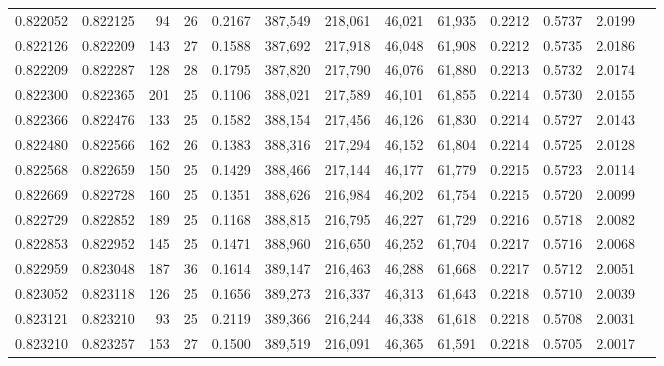 \begin{tabular}{rrrrrrrrrrrrr}
0.822052 & 0.822125 &    94 &  26 &                                     0.2167 & 387,549 & 218,061 &  46,021 &  61,935 & 0.2212 & 0.5737 & 2.0199 \\
0.822126 & 0.822209 &   143 &  27 &                                     0.1588 & 387,692 & 217,918 &  46,048 &  61,908 & 0.2212 & 0.5735 & 2.0186 \\
0.822209 & 0.822287 &   128 &  28 &                                     0.1795 & 387,820 & 217,790 &  46,076 &  61,880 & 0.2213 & 0.5732 & 2.0174 \\
0.822300 & 0.822365 &   201 &  25 &                                     0.1106 & 388,021 & 217,589 &  46,101 &  61,855 & 0.2214 & 0.5730 & 2.0155 \\
0.822366 & 0.822476 &   133 &  25 &                                     0.1582 & 388,154 & 217,456 &  46,126 &  61,830 & 0.2214 & 0.5727 & 2.0143 \\
0.822480 & 0.822566 &   162 &  26 &                                     0.1383 & 388,316 & 217,294 &  46,152 &  61,804 & 0.2214 & 0.5725 & 2.0128 \\
0.822568 & 0.822659 &   150 &  25 &                                     0.1429 & 388,466 & 217,144 &  46,177 &  61,779 & 0.2215 & 0.5723 & 2.0114 \\
0.822669 & 0.822728 &   160 &  25 &                                     0.1351 & 388,626 & 216,984 &  46,202 &  61,754 & 0.2215 & 0.5720 & 2.0099 \\
0.822729 & 0.822852 &   189 &  25 &                                     0.1168 & 388,815 & 216,795 &  46,227 &  61,729 & 0.2216 & 0.5718 & 2.0082 \\
0.822853 & 0.822952 &   145 &  25 &                                     0.1471 & 388,960 & 216,650 &  46,252 &  61,704 & 0.2217 & 0.5716 & 2.0068 \\
0.822959 & 0.823048 &   187 &  36 &                                     0.1614 & 389,147 & 216,463 &  46,288 &  61,668 & 0.2217 & 0.5712 & 2.0051 \\
0.823052 & 0.823118 &   126 &  25 &                                     0.1656 & 389,273 & 216,337 &  46,313 &  61,643 & 0.2218 & 0.5710 & 2.0039 \\
0.823121 & 0.823210 &    93 &  25 &                                     0.2119 & 389,366 & 216,244 &  46,338 &  61,618 & 0.2218 & 0.5708 & 2.0031 \\
0.823210 & 0.823257 &   153 &  27 &                                     0.1500 & 389,519 & 216,091 &  46,365 &  61,591 & 0.2218 & 0.5705 & 2.0017 \\

\end{tabular}
